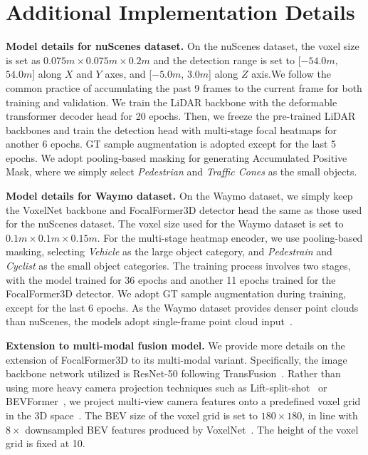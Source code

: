 \documentclass[10pt,twocolumn,letterpaper]{article}
\begin{document}
\section{Additional Implementation Details}
\label{sec:implementation-details}

\vspace{2mm}
\noindent\textbf{Model details for nuScenes dataset.}
On the nuScenes dataset, the voxel size is set as $0.075m\times 0.075m\times 0.2m$ and the detection range is set to [$-54.0m$, $54.0m$] along $X$ and $Y$ axes, and [$-5.0m$, $3.0m$] along $Z$ axis.We follow the common practice of accumulating the past 9 frames to the current frame for both training and validation. We train the LiDAR backbone with the deformable transformer decoder head for 20 epochs. Then, we freeze the pre-trained LiDAR backbones and train the detection head with multi-stage focal heatmaps for another 6 epochs. GT sample augmentation is adopted except for the last 5 epochs. We adopt pooling-based masking for generating Accumulated Positive Mask, where we simply select \textsl{Pedestrian} and \textsl{Traffic Cones} as the small objects. 

\vspace{2mm}
\noindent\textbf{Model details for Waymo dataset.}
On the Waymo dataset, we simply keep the VoxelNet backbone and FocalFormer3D detector head the same as those used for the nuScenes dataset. The voxel size used for the Waymo dataset is set to $0.1m \times 0.1m \times 0.15m$. For the multi-stage heatmap encoder, we use pooling-based masking, selecting \textsl{Vehicle} as the large object category, and \textsl{Pedestrain} and \textsl{Cyclist} as the small object categories. The training process involves two stages, with the model trained for 36 epochs and another 11 epochs trained for the FocalFormer3D detector. We adopt GT sample augmentation during training, except for the last 6 epochs. As the Waymo dataset provides denser point clouds than nuScenes, the models adopt single-frame point cloud input~\cite{centerpoint, transfusion}. 


\vspace{2mm}
\noindent\textbf{Extension to multi-modal fusion model.}
We provide more details on the extension of FocalFormer3D to its multi-modal variant. Specifically, the image backbone network utilized is ResNet-50 following TransFusion~\cite{transfusion}. Rather than using more heavy camera projection techniques such as Lift-split-shot~\cite{liftsplatshoot} or BEVFormer~\cite{li2022bevformer}, we project multi-view camera features onto a predefined voxel grid in the 3D space~\cite{oftnet}. The BEV size of the voxel grid is set to $180\times 180$, in line with $8\times$ downsampled BEV features produced by VoxelNet~\cite{VoxelNet}. The height of the voxel grid is fixed at 10.
\end{document}
